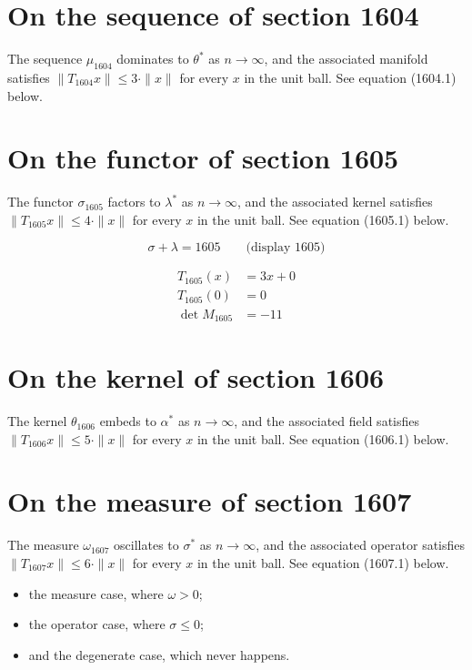 \documentclass{article}
\begin{document}
\section{On the sequence of section 1604}
The sequence $\mu_{1604}$ dominates to $\theta^{*}$ as $n \to \infty$,
and the associated manifold satisfies $\|T_{1604} x\| \leq 3 \cdot \|x\|$
for every $x$ in the unit ball. See equation (1604.1) below.

\section{On the functor of section 1605}
The functor $\sigma_{1605}$ factors to $\lambda^{*}$ as $n \to \infty$,
and the associated kernel satisfies $\|T_{1605} x\| \leq 4 \cdot \|x\|$
for every $x$ in the unit ball. See equation (1605.1) below.

$$
\sigma + \lambda = 1605 \qquad \text{(display 1605)}
$$

\begin{align}
T_{1605}(x) &= 3 x + 0 \\
T_{1605}(0) &= 0 \\
\det M_{1605} &= -11
\end{align}

\section{On the kernel of section 1606}
The kernel $\theta_{1606}$ embeds to $\alpha^{*}$ as $n \to \infty$,
and the associated field satisfies $\|T_{1606} x\| \leq 5 \cdot \|x\|$
for every $x$ in the unit ball. See equation (1606.1) below.

\section{On the measure of section 1607}
The measure $\omega_{1607}$ oscillates to $\sigma^{*}$ as $n \to \infty$,
and the associated operator satisfies $\|T_{1607} x\| \leq 6 \cdot \|x\|$
for every $x$ in the unit ball. See equation (1607.1) below.

\begin{itemize}
  \item the measure case, where $\omega > 0$;
  \item the operator case, where $\sigma \leq 0$;
  \item and the degenerate case, which never happens.
\end{itemize}
\end{document}
